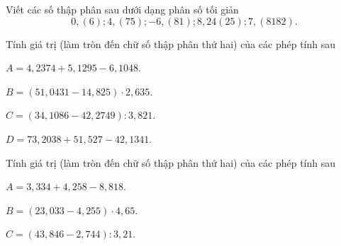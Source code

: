 \begin{bt}%
Viết các số thập phân sau dưới dạng phân số tối giản
$$ 0{,}(6);4{,}(75);-6{,}(81);8{,}24(25);7{,}(8182). $$
\end{bt}

\begin{bt}%
Tính giá trị (làm tròn đến chữ số thập phân thứ hai) của các phép tính sau
\begin{enumEX}{2}
	\item $ A=4{,}2374+5{,}1295-6{,}1048 $.
	\item $ B=(51{,}0431-14{,}825)\cdot 2{,}635 $.
	\item $ C=(34{,}1086-42{,}2749):3{,}821 $.
	\item $ D=73{,}2038+51{,}527-42{,}1341 $.
\end{enumEX}
\end{bt}

\begin{bt}%
	Tính giá trị (làm tròn đến chữ số thập phân thứ hai) của các phép tính sau
	\begin{enumEX}{2}
		\item $ A = 3{,}334+4{,}258-8{,}818 $.
		\item $ B = (23{,}033-4{,}255)\cdot 4{,}65 $.
		\item $ C = (43{,}846-2{,}744):3{,}21 $.
	\end{enumEX}
\end{bt}

